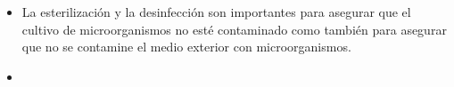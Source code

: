 \begin{itemize}
    \item La esterilización y la desinfección son importantes para asegurar que el cultivo de microorganismos no esté contaminado como también para asegurar que no se contamine el medio exterior con microorganismos.
    \item 
\end{itemize}
